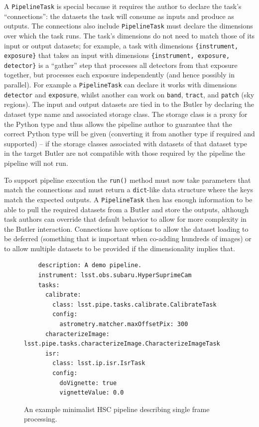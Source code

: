 \documentclass[]{spie}
\begin{document}
A \texttt{PipelineTask} is special because it requires the author to declare the task's ``connections'': the datasets the task will consume as inputs and produce as outputs.
The connections also include \texttt{PipelineTask} must declare the dimensions over which the task runs.
The task's dimensions do not need to match those of its input or output datasets; for example, a task with dimensions \texttt{\{instrument, exposure\}} that takes an input with dimensions \texttt{\{instrument, exposure, detector\}} is a ``gather'' step that processes all detectors from that exposure together, but processes each exposure independently (and hence possibly in parallel).
For example a \texttt{PipelineTask} can declare it works with dimensions \texttt{detector} and \texttt{exposure}, whilst another can work on \texttt{band}, \texttt{tract}, and \texttt{patch} (sky regions).
The input and output datasets are tied in to the Butler by declaring the dataset type name and associated storage class.
The storage class is a proxy for the Python type and thus allows the pipeline author to guarantee that the correct Python type will be given (converting it from another type if required and supported) -- if the storage classes associated with datasets of that dataset type in the target Butler are not compatible with those required by the pipeline the pipeline will not run.

To support pipeline execution the \texttt{run()} method must now take parameters that match the connections and must return a \texttt{dict}-like data structure where the keys match the expected outputs.
A \texttt{PipelineTask} then has enough information to be able to pull the required datasets from a Butler and store the outputs, although task authors can override that default behavior to allow for more complexity in the Butler interaction.
Connections have options to allow the dataset loading to be deferred (something that is important when co-adding hundreds of images) or to allow multiple datasets to be provided if the dimensionality implies that.

\begin{figure}
  \lstset{language=YAML}
  \begin{lstlisting}
    description: A demo pipeline.
    instrument: lsst.obs.subaru.HyperSuprimeCam
    tasks:
      calibrate:
        class: lsst.pipe.tasks.calibrate.CalibrateTask
        config:
          astrometry.matcher.maxOffsetPix: 300
      characterizeImage: lsst.pipe.tasks.characterizeImage.CharacterizeImageTask
      isr:
        class: lsst.ip.isr.IsrTask
        config:
          doVignette: true
          vignetteValue: 0.0
    \end{lstlisting}
  \caption{An example minimalist HSC pipeline describing single frame processing.}
  \label{fig:pipeline}
\end{figure}
\end{document}
